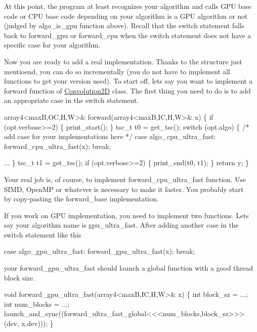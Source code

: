 At this point, the program at least recognizes your algorithm and calls G\+PU base code or C\+PU base code depending on your algorithm is a G\+PU algorithm or not (judged by algo\+\_\+is\+\_\+gpu function above). Recall that the switch statement falls back to forward\+\_\+gpu or forward\+\_\+cpu when the switch statement does not have a specific case for your algorithm.

Now you are ready to add a real implementation. Thanks to the structure just mentioend, you can do so incrementally (you do not have to implement all functions to get your version used). To start off, let\textquotesingle{}s say you want to implement a forward function of \hyperlink{structConvolution2D}{Convolution2D} class. The first thing you need to do is to add an appropriate case in the switch statement.


\begin{DoxyCode}
array4<maxB,OC,H,W>& forward(array4<maxB,IC,H,W>& x) \{
  if (opt.verbose>=2) \{ print\_start(); \}
  tsc\_t t0 = get\_tsc();
  switch (opt.algo) \{
    /* add case for your implementations here */
  case algo\_cpu\_ultra\_fast:
    forward\_cpu\_ultra\_fast(x); break;

    ...
  \}
  tsc\_t t1 = get\_tsc();
  if (opt.verbose>=2) \{ print\_end(t0, t1); \}
  return y;
\}
\end{DoxyCode}


Your real job is, of course, to implement forward\+\_\+cpu\+\_\+ultra\+\_\+fast function. Use S\+I\+MD, Open\+MP or whatever is necessary to make it faster. You probably start by copy-\/pasting the forward\+\_\+base implementation.

If you work on G\+PU implementation, you need to implement two functions. Let\textquotesingle{}s say your algorithm name is gpu\+\_\+ultra\+\_\+fast. After adding another case in the switch statement like this


\begin{DoxyCode}
case algo\_gpu\_ultra\_fast:
  forward\_gpu\_ultra\_fast(x); break;
\end{DoxyCode}


your forward\+\_\+gpu\+\_\+ultra\+\_\+fast should launch a global function with a good thread block size.


\begin{DoxyCode}
void forward\_gpu\_ultra\_fast(array4<maxB,IC,H,W>& x) \{
  int block\_sz = ...;
  int num\_blocks = ...;
  launch\_and\_sync((forward\_ultra\_fast\_global<<<num\_blocks,block\_sz>>>(dev, x.dev)));
\}
\end{DoxyCode}


